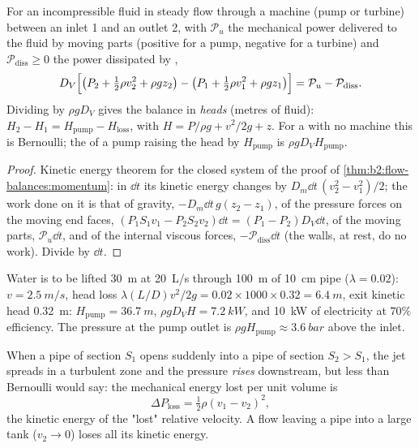 \begin{theorem}\label{thm:b2:flow-balances:energy}
For an incompressible fluid in steady flow through a machine (pump or
turbine) between an inlet 1 and an outlet 2, with $\mathcal P_u$ the
mechanical power delivered to the fluid by moving parts (positive for a
pump, negative for a turbine) and $\mathcal P_{\text{diss}} \ge 0$ the power
dissipated by ,
\[
D_V\Bigl[\bigl(P_2 + \tfrac12\rho v_2^2 + \rho gz_2\bigr) - \bigl(P_1 + \tfrac12\rho v_1^2
+ \rho gz_1\bigr)\Bigr] = \mathcal P_u - \mathcal P_{\text{diss}} .
\]
Dividing by $\rho gD_V$ gives the balance in \emph{heads} (metres of
fluid): $H_2 - H_1 = H_{\text{pump}} - H_{\text{loss}}$, with $H = P/\rho g +
v^2/2g + z$. For a  with no machine this is Bernoulli; the
\emph{} of a pump raising the head by $H_{\text{pump}}$ is
$\rho gD_VH_{\text{pump}}$.
\end{theorem}

\begin{proof}
Kinetic energy theorem for the closed system of the proof of
\cref{thm:b2:flow-balances:momentum}: in $\dd t$ its kinetic energy
changes by $D_m\dd t\,(v_2^2 - v_1^2)/2$; the work done on it is that of
gravity, $-D_m\dd t\,g(z_2 - z_1)$, of the pressure forces on the moving
end faces, $(P_1S_1v_1 - P_2S_2v_2)\dd t = (P_1 - P_2)D_V\dd t$, of the
moving parts, $\mathcal P_u\dd t$, and of the internal viscous forces,
$-\mathcal P_{\text{diss}}\dd t$ (the walls, at rest, do no work). Divide by
$\dd t$.
\end{proof}

\begin{example}\label{ex:b2:flow-balances:pump}
Water is to be lifted \qty{30}{m} at \qty{20}{L/s} through \qty{100}{m} of
\qty{10}{cm} pipe ($\lambda = 0.02$): $v = \qty{2.5}{m/s}$, head loss $\lambda(L/D)
v^2/2g = 0.02 \times 1000 \times 0.32 = \qty{6.4}{m}$, exit kinetic head
\qty{0.32}{m}: $H_{\text{pump}} = \qty{36.7}{m}$,  $\rho gD_VH =
\qty{7.2}{kW}$, and \qty{10}{kW} of electricity at $70\%$ efficiency. The
pressure at the pump outlet is $\rho gH_{\text{pump}} \approx \qty{3.6}{bar}$ above
the inlet.
\end{example}

\begin{proposition}\label{prop:b2:flow-balances:borda}
When a pipe of section $S_1$ opens suddenly into a pipe of section $S_2
> S_1$, the jet spreads in a turbulent zone and the pressure
\emph{rises} downstream, but less than Bernoulli would say: the
mechanical energy lost per unit volume is
\[
\Delta P_{\text{loss}} = \tfrac12\rho(v_1 - v_2)^2 ,
\]
the kinetic energy of the "lost" relative velocity. A flow leaving a
pipe into a large tank ($v_2 \to 0$) loses all its kinetic energy.
\end{proposition}

